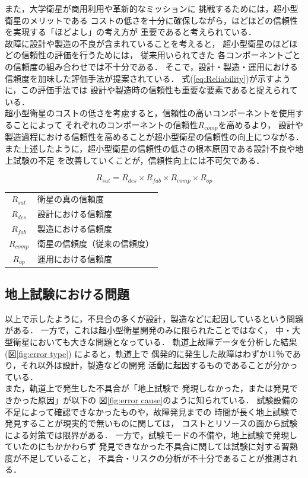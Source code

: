 \documentclass[11pt]{jsreport}
\begin{document}
また，大学衛星が商用利用や革新的なミッションに
挑戦するためには，超小型衛星のメリットである
コストの低さを十分に確保しながら，ほどほどの信頼性
を実現する「ほどよし」の考え方が
重要であると考えられている\cite{SHIRASAKA2011}．\\
故障に設計や製造の不良が含まれていることを考えると，
超小型衛星のほどほどの信頼性の評価を行うためには，
従来用いられてきた
各コンポーネントごとの信頼度の組み合わせでは不十分である．
そこで，設計・製造・運用における
信頼度を加味した評価手法が提案されている\cite{SHIRASAKA2011}．
式(\ref{eq:Reliability})が示すように，この評価手法では
設計や製造時の信頼性も重要な要素であると捉えられている．\\
超小型衛星のコストの低さを考慮すると，信頼性の高いコンポーネントを使用することによって
それぞれのコンポーネントの信頼性$R_{comp}$を高めるより，
設計や製造過程における信頼性を高めることが超小型衛星の信頼性の向上につながる．
また上述したように，超小型衛星の信頼性の低さの根本原因である設計不良や地上試験の不足
を改善していくことが，信頼性向上には不可欠である．

\begin{equation}
   R_{sat} = R_{des} \times R_{fab} \times R_{comp} \times R_{op} \label{eq:Reliability}
\end{equation}
\begin{table}[H]
   \centering
      \begin{tabular}{cl} 
        $R_{sat}$ & 衛星の真の信頼度\\
        $R_{des}$ & 設計における信頼度\\
        $R_{fab}$ & 製造における信頼度\\
        $R_{comp}$ & 衛星の信頼度（従来の信頼度）\\%
        $R_{op}$ & 運用における信頼度
      \end{tabular}
\end{table}

\subsection{地上試験における問題}
以上で示したように，不具合の多くが設計，製造などに起因しているという問題がある．
一方で，これは超小型衛星開発のみに限られたことではなく，
中・大型衛星においても大きな問題となっている．
軌道上故障データを分析した結果\cite{SAITO2011}(図\ref{fig:error type})
によると，軌道上で
偶発的に発生した故障はわずか11％であり，それ以外は設計，製造などの開発
活動に起因するものであることが分かっている．\\
また，軌道上で発生した不具合が「地上試験で
発現しなかった，または発見できかった原因」が以下の
図\ref{fig:error cause}のように知られている．
試験設備の不足によって確認できなかったものや，故障発見までの
時間が長く地上試験で発見することが現実的で無いものに関しては，
コストとリソースの面から試験による対策では限界がある．
一方で，試験モードの不備や，地上試験で発現していたのにもかかわらず
発見できなかった不具合に関しては試験に対する習熟度が不足していること，
不具合・リスクの分析が不十分であることが推測される\cite{SAITO2011}．
\end{document}
